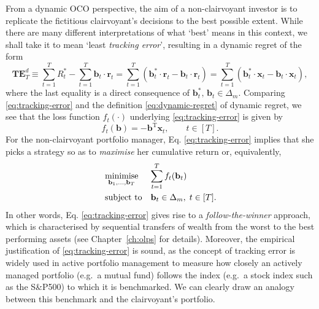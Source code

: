 From a dynamic OCO perspective, the aim of a non-clairvoyant investor is to replicate the fictitious clairvoyant's decisions to the best possible extent. While there are many different interpretations of what `best' means in this context, we shall take it to mean `least \emph{tracking error}', resulting in a dynamic regret of the form
\begin{equation}
\label{eq:tracking-error}
	\mathbf{TE}_T^d
	\equiv \sum_{t=1}^T R_t^* - \sum_{t=1}^T \mathbf{b}_t \cdot \mathbf{r}_t
	= \sum_{t=1}^T (\mathbf{b}_t^* \cdot \mathbf{r}_t - \mathbf{b}_t \cdot \mathbf{r}_t)
	= \sum_{t=1}^T (\mathbf{b}_t^* \cdot \mathbf{x}_t - \mathbf{b}_t \cdot \mathbf{x}_t),
\end{equation}
where the last equality is a direct consequence of $\mathbf{b}_t^*,\, \mathbf{b}_t \in \Delta_m$.
Comparing \eqref{eq:tracking-error} and the definition \eqref{eq:dynamic-regret} of dynamic regret, we see that the loss function $f_t(\cdot)$ underlying \eqref{eq:tracking-error} is given by
\begin{equation}
\label{eq:olps-loss-function}
	f_t(\mathbf{b}) = -\mathbf{b}^\text{T}\mathbf{x}_t,
	\qquad t \in [T].
\end{equation}
For the non-clairvoyant portfolio manager, Eq. \eqref{eq:tracking-error} implies that she picks a strategy so as to \emph{maximise} her cumulative return or, equivalently,
\begin{equation}
\label{eq:olps-problem}
\begin{split}
	& \operatorname*{minimise}_{\mathbf{b}_1, \ldots, \mathbf{b}_T} \quad\; \sum_{t=1}^T f_t(\mathbf{b}_t)
	\\
	&\, \text{subject to} \quad \mathbf{b}_t \in \Delta_m,\; t \in [T].
\end{split}
\end{equation}
In other words, Eq. \eqref{eq:tracking-error} gives rise to a \emph{follow-the-winner} approach, which is characterised by sequential transfers of wealth from the worst to the best performing assets (see Chapter~\ref{ch:olps} for details). Moreover, the empirical justification of \eqref{eq:tracking-error} is sound, as the concept of tracking error is widely used in active portfolio management to measure how closely an actively managed portfolio (e.g.\ a mutual fund) follows the index (e.g.\ a stock index such as the S\&P500) to which it is benchmarked. We can clearly draw an analogy between this benchmark and the clairvoyant's portfolio. 

